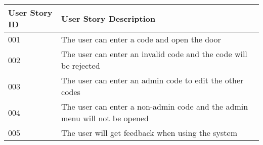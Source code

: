 
  \begin{center}
    \begin{tabular}{|l|l|}
      \hline
      \textbf{User Story ID} &
      \textbf{User Story Description}\\ 
      \hline

      001 &
      The user can enter a code and open the door \\ 
      \hline

      002 & 
      The user can enter an invalid code and the code will be rejected \\ 
      \hline

      003 & 
      The user can enter an admin code to edit the other codes \\ 
      \hline

      004 & 
      The user can enter a non-admin code and the admin menu will not be opened \\ 
      \hline

      005 &
      The user will get feedback when using the system \\ 
      \hline
    \end{tabular}
  \end{center}

